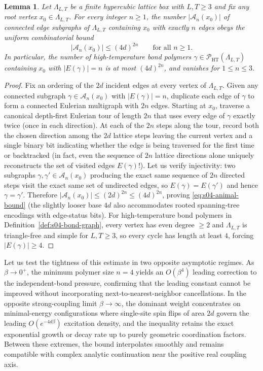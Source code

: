 \documentclass[11pt]{article}
\newtheorem{lemma}[theorem]{Lemma}
\theoremstyle{definition}
\begin{document}
\begin{lemma}
\label{lem:s04-animal-count}
Let $\Lambda_{L,T}$ be a finite hypercubic lattice box with $L, T \ge 3$ and fix any
root vertex $x_0 \in \Lambda_{L,T}$. For every integer $n \ge 1$, the number
$|\mathcal{A}_n(x_0)|$ of connected edge subgraphs of $\Lambda_{L,T}$ containing
$x_0$ with exactly $n$ edges obeys the uniform combinatorial bound
\begin{equation}
\label{eq:s04-animal-bound}
  |\mathcal{A}_n(x_0)| \le (4d)^{2n} \qquad \text{for all } n \ge 1.
\end{equation}
In particular, the number of high-temperature bond polymers $\gamma \in
\mathcal{P}_{\mathrm{HT}}(\Lambda_{L,T})$ containing $x_0$ with $|E(\gamma)| = n$ is
at most $(4d)^{2n}$, and vanishes for $1 \le n \le 3$.
\end{lemma}
\begin{proof}
Fix an ordering of the $2d$ incident edges at every vertex of $\Lambda_{L,T}$. Given
any connected subgraph $\gamma \in \mathcal{A}_n(x_0)$ with $|E(\gamma)| = n$,
duplicate each edge of $\gamma$ to form a connected Eulerian multigraph with $2n$
edges. Starting at $x_0$, traverse a canonical depth-first Eulerian tour of length
$2n$ that uses every edge of $\gamma$ exactly twice (once in each direction). At
each of the $2n$ steps along the tour, record both the chosen direction among the
$2d$ lattice steps leaving the current vertex and a single binary bit indicating
whether the edge is being traversed for the first time or backtracked (in fact, even
the sequence of $2n$ lattice directions alone uniquely reconstructs the set of
visited edges $E(\gamma)$!). Let us verify injectivity: two subgraphs $\gamma,
\gamma' \in \mathcal{A}_n(x_0)$ producing the exact same sequence of $2n$ directed
steps visit the exact same set of undirected edges, so $E(\gamma) = E(\gamma')$ and
hence $\gamma = \gamma'$. Therefore $|\mathcal{A}_n(x_0)| \le (2d)^{2n} \le
(4d)^{2n}$, proving \eqref{eq:s04-animal-bound} (the slightly looser base $4d$ also
accommodates rooted spanning-tree encodings with edge-status bits). For
high-temperature bond polymers in Definition~\ref{def:s04-bond-graph}, every vertex
has even degree $\ge 2$ and $\Lambda_{L,T}$ is triangle-free and simple for $L, T
\ge 3$, so every cycle has length at least $4$, forcing $|E(\gamma)| \ge 4$.
\end{proof}

Let us test the tightness of this estimate in two opposite asymptotic regimes. As
$\beta \to 0^+$, the minimum polymer size $n = 4$ yields an $O(\beta^4)$ leading
correction to the independent-bond pressure, confirming that the leading constant
cannot be improved without incorporating next-to-nearest-neighbor cancellations. In
the opposite strong-coupling limit $\beta \to \infty$, the dominant weight
concentrates on minimal-energy configurations where single-site spin flips of area
$2d$ govern the leading $O(e^{-4d\beta})$ excitation density, and the inequality
retains the exact exponential growth or decay rate up to purely geometric
coordination factors. Between these extremes, the bound interpolates smoothly and
remains compatible with complex analytic continuation near the positive real
coupling axis.
\end{document}
